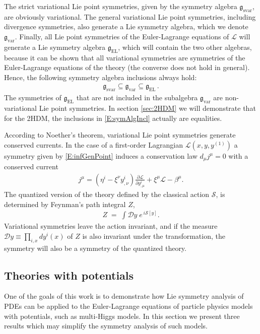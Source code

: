 \documentclass[a4paper,hidelinks, 12pt]{article}
\numberwithin{equation}{section}
\theoremstyle{plain}
\newcommand{\La}{\mathfrak}
\newcommand{\mc}{\mathcal}
\begin{document}
	The strict variational Lie point symmetries, given by the symmetry algebra $\La{g}_\text{svar}$, are obviously variational. The general variational Lie point symmetries, including divergence symmetries, also generate a Lie symmetry algebra, which we denote $\La{g}_\text{var}$. Finally, all Lie point symmetries of the Euler-Lagrange equations of $\mc{L}$ will generate a Lie symmetry algebra $\La{g}_\text{EL}$, which will contain the two other algebras, because it can be shown that all variational symmetries are symmetries of the Euler-Lagrange equations of the theory (the converse does not hold in general). 
Hence, the following symmetry algebra inclusions always hold:
\begin{align}\label{E:symAlgIncl}
	\La{g}_\text{svar} \subseteq \La{g}_\text{var}\subseteq \La{g}_\text{EL}\,.
\end{align}
The symmetries of $\La{g}_\text{EL}$ that are not included in the subalgebra $\La{g}_\text{var}$ are {non-variational Lie point symmetries}. 
In section \ref{sec:2HDM} we will demonstrate that for the 2HDM,  
 the inclusions in \eqref{E:symAlgIncl} actually are equalities. 

According to Noether's theorem, variational Lie point symmetries generate conserved currents. 
 In the case of a first-order Lagrangian $\mc{L}({x},{y},{y}^{(1)})$ a symmetry given by \eqref{E:infGenPoint} induces a conservation law $d_\mu j^\mu=0$ with a conserved current
\begin{align}
	j^\mu =(\eta^i-\xi^\nu y_{,\nu}^i)\frac{\partial\mc{L}}{\partial y^i_{,\mu}}+\xi^\mu \mc{L}-\beta^\mu.
\end{align}
The quantized version of the theory defined by the classical action $\mc{S}$, is determined by Feynman's path integral $Z$, 
\begin{align}
Z \;=\; \int \mc{D}y \; e^{\,i \mc{S}[y]}.	
\end{align}
Variational symmetries leave the action invariant, and if the measure $\mc{D}y\equiv \prod_{i,x}d y^i(x)$ of $Z$
is also invariant under the transformation, the symmetry will also be a symmetry of the quantized theory.

\subsection{Theories with potentials}
\label{sec:MultiHiggsModels}
One of the goals of this work is to demonstrate how Lie symmetry analysis of PDEs can be applied to the Euler-Lagrange equations of particle physics models with potentials, such as multi-Higgs models.  
In this section we present 
three results which may simplify the symmetry analysis of such models.
\end{document}
